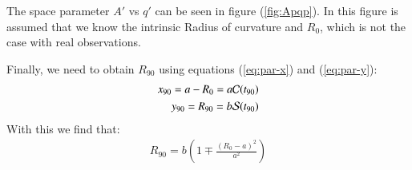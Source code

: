 The space parameter $A'$ vs $q'$ can be seen in figure (\ref{fig:Apqp}). In this figure is assumed that we know the intrinsic Radius of curvature and $R_0$, which is not the case with
real observations.



Finally, we need to obtain $R_{90}$ using equations (\ref{eq:par-x}) and (\ref{eq:par-y}):
\begin{align}
x_{90} = a - R_0 = a\mathcal{C}(t_{90}) \\
y_{90} = R_{90} = b\mathcal{S}(t_{90})
\end{align}
With this we find that:
\begin{align}
R_{90} = b\left(1 \mp \frac{(R_0-a)^2}{a^2}\right)
\end{align}
 

